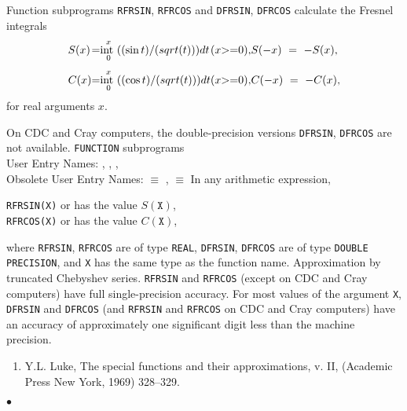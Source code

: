                                 
                         
\Submitter{}                                   
                            
Function subprograms
{\tt RFRSIN}, {\tt RFRCOS} and {\tt DFRSIN}, {\tt DFRCOS}
calculate the Fresnel integrals
$$ \begin{array}{l@{\quad = \quad}l@{\qquad}l@{\qquad}l}
S(x) & \displaystyle \int^x_0\frac{\sin t}{\sqrt{t}}dt & (x \ge 0), &
S(-x) \ = \ -S(x), \\[4mm]
C(x) & \displaystyle \int ^x_0\frac{\cos t}{\sqrt{t}}dt & (x \ge 0), &
C(-x) \ = \ -C(x),
\end{array} $$
for real arguments $x$.
\par
On  CDC and  Cray computers, the double-precision versions
{\tt DFRSIN}, {\tt DFRCOS} are not available.
\Structure
{\tt FUNCTION} subprograms \\
User Entry Names: , , ,
 \\
Obsolete User Entry Names:  $\equiv$ ,
                            $\equiv$ 
\Usage
In any arithmetic expression,
\begin{center}
{\tt RFRSIN(X)} \quad or  \quad has the value \quad
$S(\mathtt{X})$,\\
{\tt RFRCOS(X)} \quad or  \quad has the value \quad
$C(\mathtt{X})$,
\end{center}
where {\tt RFRSIN}, {\tt RFRCOS} are of type {\tt REAL},
{\tt DFRSIN}, {\tt DFRCOS} are of type {\tt DOUBLE PRECISION},
and {\tt X} has the same type as the function name.
\Method
Approximation by truncated Chebyshev series.
\Accuracy
{\tt RFRSIN} and {\tt RFRCOS} (except on CDC and Cray computers)
have full single-precision accuracy.
For most values of the argument {\tt X}, {\tt DFRSIN} and {\tt DFRCOS}
(and {\tt RFRSIN} and {\tt RFRCOS} on CDC and Cray computers) have an
accuracy of approximately one significant digit less than the machine
precision.
\Refer
\begin{enumerate}
\item Y.L. Luke, The special functions and their
approximations, v. II, (Academic Press New York, 1969) 328--329.
\end{enumerate}
$\bullet$
